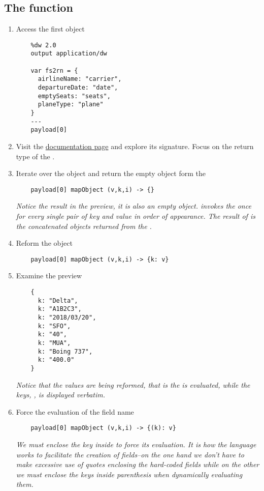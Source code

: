 \subsection{The  function}
\begin{enumerate}[resume*]
\item Access the first object
  \begin{lstlisting}
    %dw 2.0
    output application/dw
    
    var fs2rn = {
      airlineName: "carrier",
      departureDate: "date",
      emptySeats: "seats",
      planeType: "plane"
    }
    ---
    payload[0]
  \end{lstlisting}
\item Visit the \href{https://docs.mulesoft.com/mule-runtime/4.3/dw-core-functions-mapobject}{ documentation page} and explore its signature.  Focus on the return type of the \les{}.
\item Iterate over the object and return the empty object form the \les
  \begin{lstlisting}
    payload[0] mapObject (v,k,i) -> {}
  \end{lstlisting}
  \emph{
    Notice the result in the preview, it is also an empty object.   invokes the \les{} once for every single pair of key and value in order of appearance.  The result of  is the concatenated objects returned from the \les.
  }
\item Reform the object
  \begin{lstlisting}
    payload[0] mapObject (v,k,i) -> {k: v}
  \end{lstlisting}
\item Examine the preview
  \begin{lstlisting}
    {
      k: "Delta",
      k: "A1B2C3",
      k: "2018/03/20",
      k: "SFO",
      k: "40",
      k: "MUA",
      k: "Boing 737",
      k: "400.0"
    }
  \end{lstlisting}
  \emph{
    Notice that the values are being reformed, that is the  is evaluated, while the keys, , is displayed verbatim.
  }
\item Force the evaluation of the field name
  \begin{lstlisting}
    payload[0] mapObject (v,k,i) -> {(k): v}
  \end{lstlisting}
  \emph{
    We must enclose the key inside \ttt{()} to force its evaluation.  It is how the language works to facilitate the creation of fields--on the one hand we don't have to make excessive use of quotes enclosing the hard-coded fields while on the other we must enclose the keys inside parenthesis when dynamically evaluating them.
  }
\end{enumerate}

